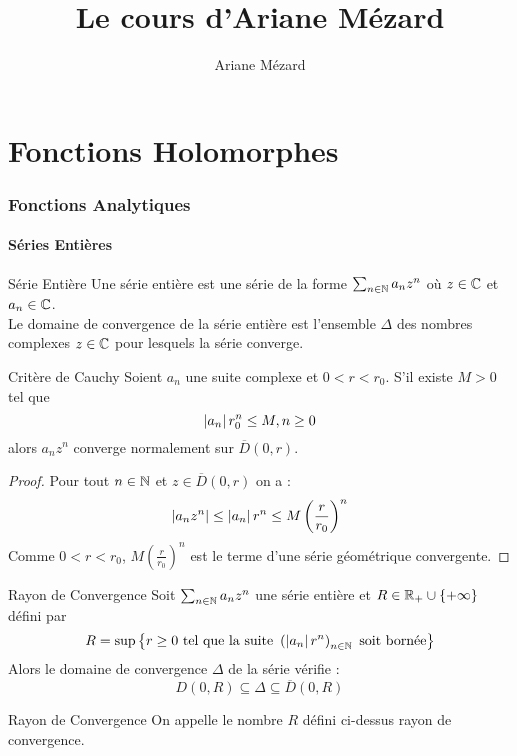 \documentclass{cours}
\title{Le cours d'Ariane Mézard}
\author{Ariane Mézard}
\begin{document}
\part{Fonctions Holomorphes}
\section{Fonctions Analytiques}
\subsection{Séries Entières}
\begin{définition}{Série Entière}{}
    Une série entière est une série de la forme $\sum_{n \in \mathbb{N}}a_{n}z^{n}$ où $z \in \mathbb{C}$ et $a_{n} \in \mathbb{C}$.\\
    Le domaine de convergence de la série entière est l'ensemble $\Delta$ des nombres complexes $z \in \mathbb{C}$ pour lesquels la série converge.  
\end{définition}
\begin{propositionfr}{Critère de Cauchy}{}
    Soient $a_{n}$ une suite complexe et $0 < r < r_{0}$. S'il existe $M > 0$ tel que 
    \[
        \left|a_{n}\right|r_{0}^{n} \leq M, n \geq 0
    \]
    alors $a_{n}z^{n}$ converge normalement sur $\overline{D}(0, r)$.
\end{propositionfr}
\begin{proof}
    Pour tout $n \in \mathbb{N}$ et $z \in \overline{D}(0, r)$ on a : 
    \[
        \left|a_{n}z^{n}\right| \leq \left|a_{n}\right|r^{n} \leq M\left(\frac{r}{r_{0}}\right)^{n}
    \]
    Comme $0 < r < r_{0}$, $M \left(\frac{r}{r_{0}}\right)^{n}$ est le terme d'une série géométrique convergente.
\end{proof}

\begin{corollaire}{Rayon de Convergence}{}
    Soit $\sum_{n \in \mathbb{N}} a_{n}z^{n}$ une série entière et $R \in \mathbb{R}_{+} \cup \{+ \infty\}$ défini par 
    \[
        R = \sup \left\{r \geq 0 \text{ tel que la suite } \left(\left|a_{n}\right|r^{n}\right)_{n \in \mathbb{N}} \text{ soit bornée}\right\}
    \]
    Alors le domaine de convergence $\Delta$ de la série vérifie : 
    \[
        D(0, R) \subseteq \Delta \subseteq \overline{D}(0, R)
    \]
\end{corollaire}

\begin{définition}{Rayon de Convergence}{}
    On appelle le nombre $R$ défini ci-dessus rayon de convergence.
\end{définition}
\end{document}
